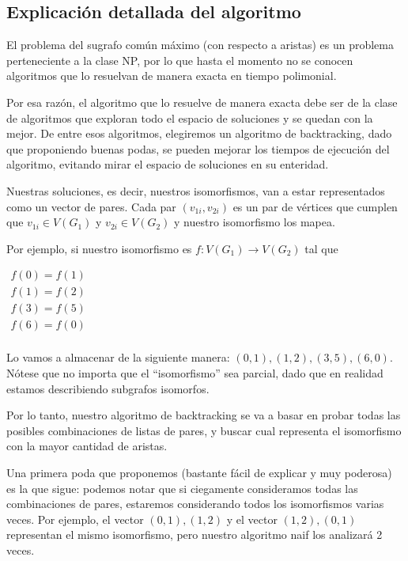 \subsection{Explicación detallada del algoritmo}

El problema del sugrafo común máximo (con respecto a aristas) es un problema perteneciente a la clase NP, por lo que hasta el momento no se conocen algoritmos que lo resuelvan de manera exacta en tiempo polimonial. 

Por esa razón, el algoritmo que lo resuelve de manera exacta debe ser de la clase de algoritmos que exploran todo el espacio de soluciones y se quedan con la mejor. De entre esos algoritmos, elegiremos un algoritmo de backtracking, dado que proponiendo buenas podas, se pueden mejorar los tiempos de ejecución del algoritmo, evitando mirar el espacio de soluciones en su enteridad.

Nuestras soluciones, es decir, nuestros isomorfismos, van a estar representados como un vector de pares. Cada par $(v_{1i}, v_{2i})$ es un par de vértices que cumplen que $v_{1i} \in V(G_1)$ y $v_{2i} \in V(G_2)$ y nuestro isomorfismo los mapea. 

Por ejemplo, si nuestro isomorfismo es $f : V(G_1) \to V(G_2)$ tal que

$
\begin{matrix}
f(0) = f(1) \\
f(1) = f(2) \\
f(3) = f(5) \\
f(6) = f(0) \\
\end{matrix}
$

Lo vamos a almacenar de la siguiente manera: ${(0,1), (1,2), (3,5), (6,0)}$. Nótese que no importa que el ``isomorfismo'' sea parcial, dado que en realidad estamos describiendo subgrafos isomorfos.

Por lo tanto, nuestro algoritmo de backtracking se va a basar en probar todas las posibles combinaciones de listas de pares, y buscar cual representa el isomorfismo con la mayor cantidad de aristas. 

Una primera poda que proponemos (bastante fácil de explicar y muy poderosa) es la que sigue: podemos notar que si ciegamente consideramos todas las combinaciones de pares, estaremos considerando todos los isomorfismos varias veces.
Por ejemplo, el vector ${(0,1), (1,2)}$ y el vector ${(1,2), (0,1)}$ representan el mismo isomorfismo, pero nuestro algoritmo naif los analizará 2 veces.

